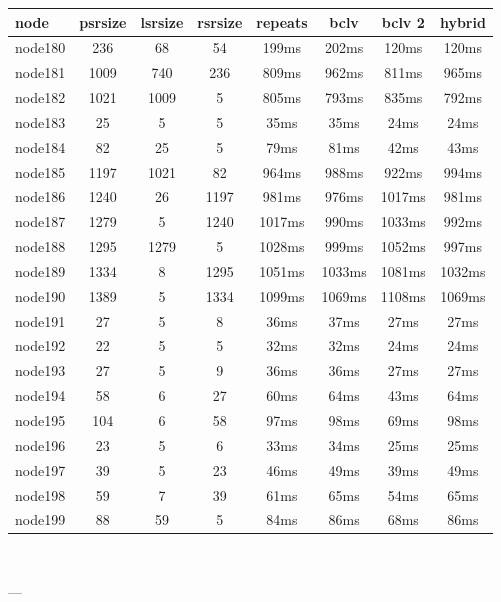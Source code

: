 \begin{tabular}{|l|c|c|c|c|c|c|c|}
\hline node & psrsize & lsrsize & rsrsize   & repeats & bclv & bclv 2 & hybrid\\
    \hline node180 & 236 & 68 & 54 & 199ms & 202ms & 120ms & 120ms\\
    \hline node181 & 1009 & 740 & 236 & 809ms & 962ms & 811ms & 965ms\\
    \hline node182 & 1021 & 1009 & 5 & 805ms & 793ms & 835ms & 792ms\\
    \hline node183 & 25 & 5 & 5 & 35ms & 35ms & 24ms & 24ms\\
    \hline node184 & 82 & 25 & 5 & 79ms & 81ms & 42ms & 43ms\\
    \hline node185 & 1197 & 1021 & 82 & 964ms & 988ms & 922ms & 994ms\\
    \hline node186 & 1240 & 26 & 1197 & 981ms & 976ms & 1017ms & 981ms\\
    \hline node187 & 1279 & 5 & 1240 & 1017ms & 990ms & 1033ms & 992ms\\
    \hline node188 & 1295 & 1279 & 5 & 1028ms & 999ms & 1052ms & 997ms\\
    \hline node189 & 1334 & 8 & 1295 & 1051ms & 1033ms & 1081ms & 1032ms\\
    \hline node190 & 1389 & 5 & 1334 & 1099ms & 1069ms & 1108ms & 1069ms\\
    \hline node191 & 27 & 5 & 8 & 36ms & 37ms & 27ms & 27ms\\
    \hline node192 & 22 & 5 & 5 & 32ms & 32ms & 24ms & 24ms\\
    \hline node193 & 27 & 5 & 9 & 36ms & 36ms & 27ms & 27ms\\
    \hline node194 & 58 & 6 & 27 & 60ms & 64ms & 43ms & 64ms\\
    \hline node195 & 104 & 6 & 58 & 97ms & 98ms & 69ms & 98ms\\
    \hline node196 & 23 & 5 & 6 & 33ms & 34ms & 25ms & 25ms\\
    \hline node197 & 39 & 5 & 23 & 46ms & 49ms & 39ms & 49ms\\
    \hline node198 & 59 & 7 & 39 & 61ms & 65ms & 54ms & 65ms\\
    \hline node199 & 88 & 59 & 5 & 84ms & 86ms & 68ms & 86ms\\

\hline
\end{tabular} \

---


